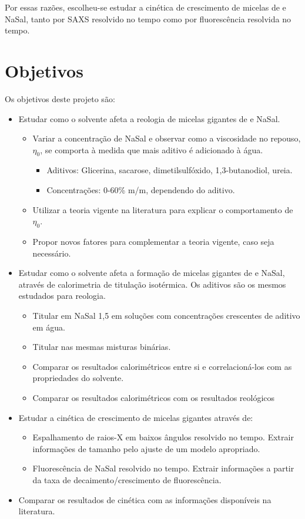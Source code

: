 		Por essas razões, escolheu-se estudar a cinética de crescimento de micelas de \TTAB{} e NaSal, tanto por SAXS resolvido no tempo como por fluorescência resolvida no tempo.
		
	\chapter{Objetivos}
		Os objetivos deste projeto são:
		
		\begin{itemize}[noitemsep]
			\item Estudar como o solvente afeta a reologia de micelas gigantes de \CTAB{} e NaSal.
				\begin{itemize}[noitemsep]
					\item Variar a concentração de NaSal e observar como a viscosidade no repouso, \(\eta_0\), se comporta à medida que mais aditivo é adicionado à água.
						\begin{itemize}[noitemsep]
							\item Aditivos: Glicerina, sacarose, dimetilsulfóxido, 1,3-butanodiol, ureia.
							\item Concentrações: 0-60\% m/m, dependendo do aditivo.
						\end{itemize}
					\item Utilizar a teoria vigente na literatura para explicar o comportamento de \(\eta_0\).
					\item Propor novos fatores para complementar a teoria vigente, caso seja necessário.
				\end{itemize}
			\item Estudar como o solvente afeta a formação de micelas gigantes de \TTAB{} e NaSal, através de calorimetria de titulação isotérmica. Os aditivos são os mesmos estudados para reologia.
				\begin{itemize}[noitemsep]
					\item Titular \TTAB{} em NaSal 1,5\mM{} em soluções com concentrações crescentes de aditivo em água.
					\item Titular \TTAB{} nas mesmas misturas binárias.
					\item Comparar os resultados calorimétricos entre si e correlacioná-los com as propriedades do solvente.
					\item Comparar os resultados calorimétricos com os resultados reológicos
				\end{itemize}
			\item Estudar a cinética de crescimento de micelas gigantes através de:
				\begin{itemize}[noitemsep]
					\item Espalhamento de raios-X em baixos ângulos resolvido no tempo. Extrair informações de tamanho pelo ajuste de um modelo apropriado.
					\item Fluorescência de NaSal resolvido no tempo. Extrair informações a partir da taxa de decaimento/crescimento de fluorescência.
				\end{itemize}
			\item Comparar os resultados de cinética com as informações disponíveis na literatura.
		\end{itemize}
	